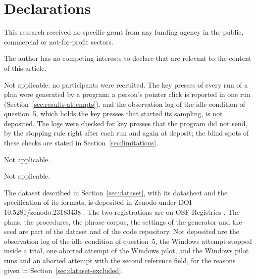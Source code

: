 
\backmatter

\section*{Declarations}

This research received no specific grant from any funding agency in the public, commercial or not-for-profit sectors.

The author has no competing interests to declare that are relevant to the content of this article.

Not applicable: no participants were recruited. The key presses of every run of a plan were generated by a program;
a person's pointer click is reported in one run (Section~\ref{sec:results-attempts}), and the observation log of the
idle condition of question~5, which holds the key presses that started its sampling, is not deposited. The logs were
checked for key presses that the program did not send, by the stopping rule right after each run and again at deposit;
the blind spots of these checks are stated in Section~\ref{sec:limitations}.

Not applicable.

Not applicable.

The dataset described in Section~\ref{sec:dataset}, with its datasheet and the specification of its formats, is
deposited in Zenodo under DOI 10.5281/zenodo.23183438 \citep{dataset}. The two registrations are
on OSF Registries \citep{prereg-macos,prereg-windows}. The plans, the procedures, the phrase corpus, the settings of the
generator and the seed are part of the dataset and of the code repository. Not deposited are the observation log of the
idle condition of question~5, the Windows attempt stopped inside a trial, one aborted attempt of the Windows pilot, and
the Windows pilot runs and an aborted attempt with the second reference field, for the reasons given in
Section~\ref{sec:dataset-excluded}.


